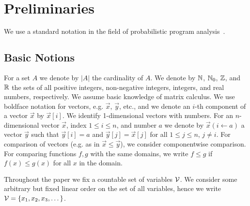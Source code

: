 
\vspace{-1em}
\section{Preliminaries}\label{sec:prelim}

We use a standard notation in the field of probabilistic program 
analysis~\cite{CNZ17}.

\vspace{-1em}
\subsection{Basic Notions}
\vspace{-0.5em}
For a set $A$ we denote by $|A|$ the cardinality of $A$. We denote by $\mathbb{N}$,
$\mathbb{N}_0$, $\mathbb{Z}$, and $\mathbb{R}$ the sets of all positive integers, non-negative
integers, integers, and real numbers, respectively. We assume basic knowledge 
of matrix calculus.
We use boldface notation for
vectors, e.g. $\vec{x}$, $\vec{y}$, etc., and we denote an $i$-th component of a
vector $\vec{x}$ by $\vec{x}[i]$. 
We identify 1-dimensional vectors with numbers. For an 
$n$-dimensional vector 
$\vec{x}$, index $1 \leq i\leq n$, and number $a$ we denote by $\vec{x}(i\leftarrow a)$ 
a 
vector $\vec{y}$ such that $\vec{y}[i]=a$ and $\vec{y}[j]=\vec{x}[j]$ for all 
$1\leq j \leq n$, $j\neq i$.
For comparison of vectors (e.g. as in $\vec{x}\leq \vec{y}$), we consider componentwise 
comparison. 
For comparing functions $f,g$ with the same domains, we write $f\leq g$ 
if $f(x)\leq g(x)$ for all $x$ in the domain.


\smallskip{}
Throughout the paper we fix a countable set of variables $\mathcal{V}$. 
We consider some arbitrary but fixed linear order on the set of all variables, 
hence we write 
$\mathcal{V}=\{x_1,x_2,x_3,\dots\}$. 


